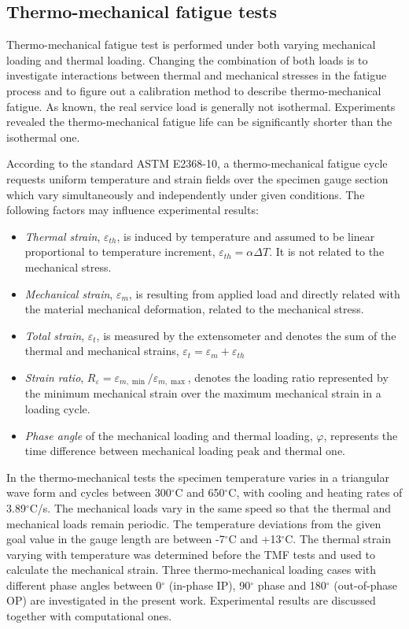 \documentclass[preprint,5p,twocolumn,11pt,sort&compress]{elsarticle}
\begin{document}
\subsection{Thermo-mechanical fatigue tests}
\noindent
Thermo-mechanical fatigue test is performed under both varying mechanical loading and thermal loading.
Changing the combination of both loads is to investigate interactions between thermal and mechanical stresses in the fatigue process and to figure out a calibration method to describe thermo-mechanical fatigue. As known, the real service load is generally not isothermal. Experiments revealed the thermo-mechanical fatigue life can be significantly shorter than the isothermal one.

According to the standard ASTM E2368-10, a thermo-mechanical fatigue cycle requests uniform temperature and strain fields over the specimen gauge section which vary simultaneously and independently under given conditions. The following factors may influence experimental results:
\begin{itemize}
  \item {\em Thermal strain}, $\varepsilon_{th}$, is induced by temperature and assumed to be linear proportional to temperature increment, $\varepsilon_{th}=\alpha \Delta T$.  It is not related to the mechanical stress.
  \item {\em Mechanical strain}, $\varepsilon_{m}$, is resulting from applied load and directly related with the material mechanical deformation, related to the mechanical stress.
  \item {\em Total strain}, $\varepsilon_t$, is measured by the extensometer and denotes the sum of the thermal and mechanical strains, $\varepsilon_t=\varepsilon_m+\varepsilon_{th}$
  \item {\em Strain ratio}, $ R_{\varepsilon}=\varepsilon_{m,\min}/\varepsilon_{m,\max}$, denotes the loading ratio represented by the minimum mechanical strain over the maximum mechanical strain in a loading cycle.
  \item {\em Phase angle} of the mechanical loading and thermal loading, $\varphi$, represents the time difference between mechanical loading peak and thermal one.
\end{itemize}


In the thermo-mechanical tests the specimen temperature varies in a triangular wave form and cycles between 300$^{\circ}$C and 650$^{\circ}$C, with cooling and heating rates of 3.89$^{\circ}$C/s. The mechanical loads vary in the same speed so that the thermal and mechanical loads remain periodic.
The temperature deviations from the given goal value in the gauge length are between -7$^{\circ}$C and +13$^{\circ}$C.
The thermal strain varying with temperature was determined before the TMF tests and used to calculate the mechanical strain.
Three thermo-mechanical loading cases with different phase angles between 0$^{\circ}$ (in-phase IP), 90$^{\circ}$ phase and 180$^{\circ}$ (out-of-phase OP) are investigated in the present work.
Experimental results are discussed together with computational ones.
\end{document}
